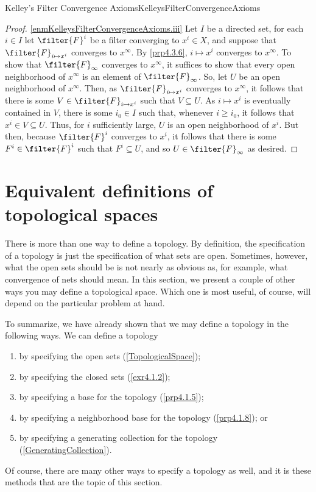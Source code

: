 \begin{prp}{Kelley's Filter Convergence Axioms}{KelleysFilterConvergenceAxioms}
\begin{proof}
\blankline
\noindent
\cref{enmKelleysFilterConvergenceAxioms.iii} Let $I$ be a directed set, for each $i\in I$ let $\filter{F}^i$ be a filter converging to $x^i\in X$, and suppose that $\filter{F}_{i\mapsto x^i}$ converges to $x^\infty$.  By \cref{prp4.3.6}, $i\mapsto x^i$ converges to $x^\infty$.  To show that $\filter{F}_\infty$ converges to $x^\infty$, it suffices to show that every open neighborhood of $x^\infty$ is an element of $\filter{F}_\infty$.  So, let $U$ be an open neighborhood of $x^\infty$.  Then, as $\filter{F}_{i\mapsto x^i}$ converges to $x^\infty$, it follows that there is some $V\in \filter{F}_{i\mapsto x^i}$ such that $V\subseteq U$.  As $i\mapsto x^i$ is eventually contained in $V$, there is some $i_0\in I$ such that, whenever $i\geq i_0$, it follows that $x^i\in V\subseteq U$.  Thus, for $i$ sufficiently large, $U$ is an open neighborhood of $x^i$.  But then, because $\filter{F}^i$ converges to $x^i$, it follows that there is some $F^i\in \filter{F}^i$ such that $F^i\subseteq U$, and so $U\in \filter{F}_{\infty}$ as desired.
\end{proof}
\end{prp}

\section{Equivalent definitions of topological spaces}

There is more than one way to define a topology.  By definition, the specification of a topology is just the specification of what sets are open.  Sometimes, however, what the open sets should be is not nearly as obvious as, for example, what convergence of nets should mean.  In this section, we present a couple of other ways you may define a topological space.  Which one is most useful, of course, will depend on the particular problem at hand.

To summarize, we have already shown that we may define a topology in the following ways.  We can define a topology
\begin{enumerate}
\item by specifying the open sets (\cref{TopologicalSpace});
\item by specifying the closed sets (\cref{exr4.1.2});
\item by specifying a base for the topology (\cref{prp4.1.5});
\item by specifying a neighborhood base for the topology (\cref{prp4.1.8}); or
\item by specifying a generating collection for the topology (\cref{GeneratingCollection}).
\end{enumerate}
Of course, there are many other ways to specify a topology as well, and it is these methods that are the topic of this section.

